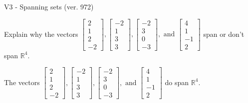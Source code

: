 \begin{exercise}
  \begin{exerciseTitle}V3 - Spanning sets (ver. 972)\end{exerciseTitle}
  \begin{exerciseStatement}
    Explain why the vectors \(\left[\begin{array}{r}
2 \\
1 \\
2 \\
-2
\end{array}\right] , \left[\begin{array}{r}
-2 \\
1 \\
3 \\
3
\end{array}\right] , \left[\begin{array}{r}
-2 \\
3 \\
0 \\
-3
\end{array}\right] , \text{ and } \left[\begin{array}{r}
4 \\
1 \\
-1 \\
2
\end{array}\right]\) span or don't span \(\mathbb{R}^4\). 
	


  \end{exerciseStatement}
  \begin{exerciseAnswer}
   The vectors \(\left[\begin{array}{r}
2 \\
1 \\
2 \\
-2
\end{array}\right] , \left[\begin{array}{r}
-2 \\
1 \\
3 \\
3
\end{array}\right] , \left[\begin{array}{r}
-2 \\
3 \\
0 \\
-3
\end{array}\right] , \text{ and } \left[\begin{array}{r}
4 \\
1 \\
-1 \\
2
\end{array}\right]\) 
  	 do  
	span \(\mathbb{R}^4\).
  


  \end{exerciseAnswer}
\end{exercise}